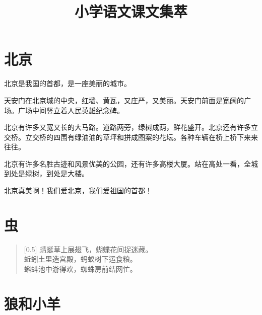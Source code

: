 \documentclass[12pt,UTF-8,openany]{ctexbook}
\title{\zihao{0} \bfseries 小学语文课文集萃}
\author{}
\date{}
\begin{document}
\maketitle
\tableofcontents
\newpage

\chapter{北京}

\begin{large}
    
    北京是我国的首都，是一座美丽的城市。
    
    天安门在北京城的中央，红墙、黄瓦，又庄严，又美丽。天安门前面是宽阔的广场。广场中间竖立着人民英雄纪念碑。
    
    北京有许多又宽又长的大马路。道路两旁，绿树成荫，鲜花盛开。北京还有许多立交桥。立交桥的四围有绿油油的草坪和拼成图案的花坛。各种车辆在桥上桥下来来往往。
    
    北京有许多名胜古迹和风景优美的公园，还有许多高楼大厦。站在高处一看，全城到处是绿树，到处是大楼。
    
    北京真美啊！我们爱北京，我们爱祖国的首都！
    
\end{large}



\chapter{虫}

\begin{large}
    
    \begin{verse}[0.5\linewidth]
        蜻蜓草上展翅飞，蝴蝶花间捉迷藏。 \\
        蚯蚓土里造宫殿，蚂蚁树下运食粮。 \\
        蝌蚪池中游得欢，蜘蛛房前结网忙。
    \end{verse}
    
\end{large}



\chapter{狼和小羊}
\end{document}
